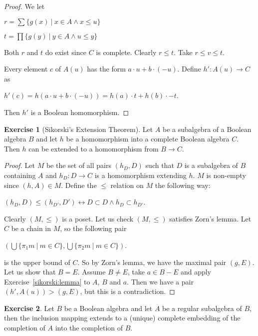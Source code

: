 \documentclass[8pt]{article}
\theoremstyle{definition}
\theoremstyle{definition}
\theoremstyle{definition}
\theoremstyle{definition}
\theoremstyle{definition}
\theoremstyle{definition}
\theoremstyle{definition}
\theoremstyle{definition}
\theoremstyle{definition}
\theoremstyle{definition}
\theoremstyle{definition}
\theoremstyle{definition}
\theoremstyle{definition}
\newtheorem{exercise}{Exercise}[section]
\theoremstyle{definition}
\theoremstyle{question}
\begin{document}
\begin{proof}
  We let
  \begin{center}
    $r = \sum \{ g(x) \: | \: x \in A \land x \leq u \}$

    $t = \prod \{ g(y) \: | \: y \in A \land u \leq y \}$
  \end{center}
  Both $r$ and $t$ do exist since $C$ is complete. Clearly $r \leq t$. Take $r \leq v \leq t$.

  Every element $c$ of $A(u)$ has the form $a \cdot u + b \cdot (- u)$. Define
  $h' : A(u) \to C$ as
  \begin{center}
    $h'(c) = h(a \cdot u + b \cdot (- u)) = h(a) \cdot t + h(b) \cdot - t$.
  \end{center}
  Then $h'$ is a Boolean homomorphism.
\end{proof}

\begin{exercise}[Sikorski's Extension Theorem]
  Let $A$ be a subalgebra of a Boolean algebra $B$ and let $h$ be a homomorphism into a complete Boolean algebra
  $C$. Then $h$ can be extended to a homomorphism from $B \to C$.
\end{exercise}

\begin{proof}
  Let $M$ be the set of all pairs $(h_D, D)$ such that $D$ is a subalgebra of $B$ containing $A$
  and $h_D : D \to C$ is a homomorphism extending $h$. $M$ is non-empty since $(h, A) \in M$.
  Define the $\leq$ relation on $M$ the following way:
  \begin{center}
    $(h_D, D) \leq (h_{D'}, D') \leftrightarrow D \subset D \land h_D \subset h_{D'}$.
  \end{center} 
  Clearly $(M, \leq)$ is a poset. Let us check $(M, \leq)$ satisfies Zorn's lemma.
  Let $C$ be a chain in $M$, so the following pair
  \begin{center}
    $(\bigcup \{ \pi_1 m \: | \: m \in C \}, \bigcup \{ \pi_2 m \: | \: m \in C \})$.
  \end{center}
  is the upper bound of $C$. So by Zorn's lemma, we have the maximal pair $(g, E)$.
  Let us show that $B = E$.
  Assume $B \neq E$, take $a \in B - E$ and apply Exercise~\ref{sikorski:lemma} to $A$, $B$ and $a$.
  Then we have a pair $(h', A(u)) > (g, E)$, but this is a contradiction.
\end{proof}

\begin{exercise}
  Let $B$ be a Boolean algebra and let $A$ be a regular subalgebra of $B$, then the inclusion mapping
  extends to a (unique) complete embedding of the completion of $A$ into the completion of $B$.
\end{exercise}
\end{document}
